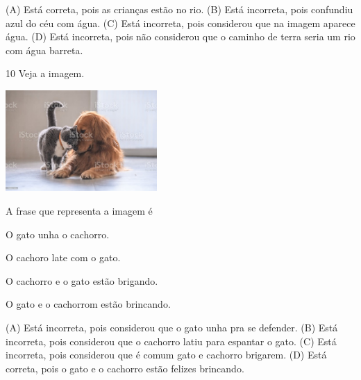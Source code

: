 
(A) Está correta, pois as crianças estão no rio.
(B) Está incorreta, pois confundiu azul do céu com água.
(C) Está incorreta, pois considerou que na imagem aparece água.
(D) Está incorreta, pois não considerou que o caminho de terra seria um rio com água barreta.

\num{10} Veja a imagem.

\includegraphics[width=2.27539in,height=1.51515in]{media/image158.jpeg}


A frase que representa a imagem é

\begin{escolha}
\item O gato unha o cachorro.

\item O cachoro late com o gato.

\item O cachorro e o gato estão brigando.

\item O gato e o cachorrom estão brincando.
\end{escolha}


(A) Está incorreta, pois considerou que o gato unha pra se defender.
(B) Está incorreta, pois considerou que o cachorro latiu para espantar o gato.
(C) Está incorreta, pois considerou que é comum gato e cachorro brigarem.
(D) Está correta, pois o gato e o cachorro estão felizes brincando.

